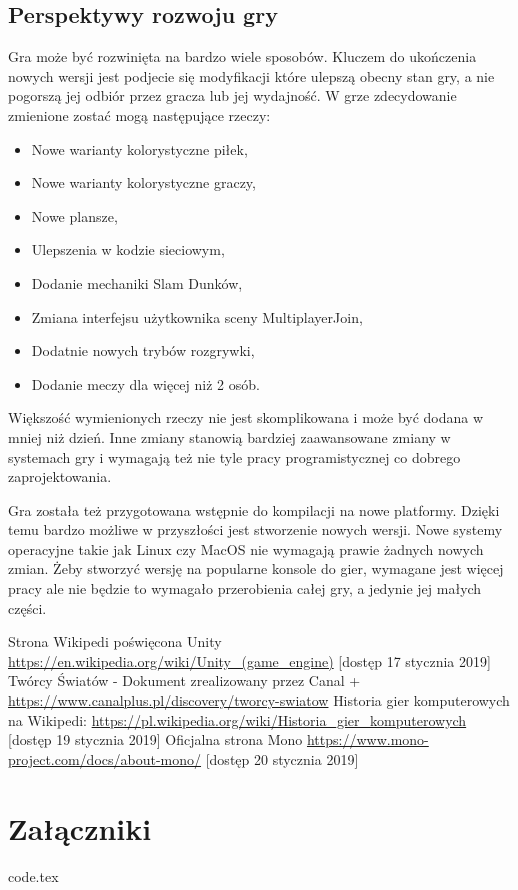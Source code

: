 \documentclass[a4paper,12pt,twoside,openany]{report}
\begin{document}
\section{Perspektywy rozwoju gry}

Gra może być rozwinięta na bardzo wiele sposobów. Kluczem do ukończenia nowych wersji jest podjecie się modyfikacji które ulepszą obecny stan gry, a nie pogorszą jej odbiór przez gracza lub jej wydajność. W grze zdecydowanie zmienione zostać mogą następujące rzeczy:
\begin{itemize}
    \item Nowe warianty kolorystyczne piłek,
    \item Nowe warianty kolorystyczne graczy,
    \item Nowe plansze,
    \item Ulepszenia w kodzie sieciowym,
    \item Dodanie mechaniki Slam Dunków,
    \item Zmiana interfejsu użytkownika sceny MultiplayerJoin,
    \item Dodatnie nowych trybów rozgrywki,
    \item Dodanie meczy dla więcej niż 2 osób.
\end{itemize}
Większość wymienionych rzeczy nie jest skomplikowana i może być dodana w mniej niż dzień. Inne zmiany stanowią bardziej zaawansowane zmiany w systemach gry i wymagają też nie tyle pracy programistycznej co dobrego zaprojektowania.

Gra została też przygotowana wstępnie do kompilacji na nowe platformy. Dzięki temu bardzo możliwe w przyszłości jest stworzenie nowych wersji. Nowe systemy operacyjne takie jak Linux czy MacOS nie wymagają prawie żadnych nowych zmian. Żeby stworzyć wersję na popularne konsole do gier, wymagane jest więcej pracy ale nie będzie to wymagało przerobienia całej gry, a jedynie jej małych części.


\begin{thebibliography}{99}
 {Strona Wikipedi poświęcona Unity  \url{https://en.wikipedia.org/wiki/Unity_(game_engine)} [dostęp 17 stycznia 2019]}
 {Twórcy Światów - Dokument zrealizowany przez Canal + \url{https://www.canalplus.pl/discovery/tworcy-swiatow}}
 {Historia gier komputerowych na Wikipedi: \url{https://pl.wikipedia.org/wiki/Historia_gier_komputerowych} [dostęp 19 stycznia 2019]}
 {Oficjalna strona Mono \url{https://www.mono-project.com/docs/about-mono/} [dostęp 20 stycznia 2019]}

\end{thebibliography}

\listoffigures
 
\listoftables

\appendix
\chapter{Załączniki}
     {code.tex}

\end{document}
